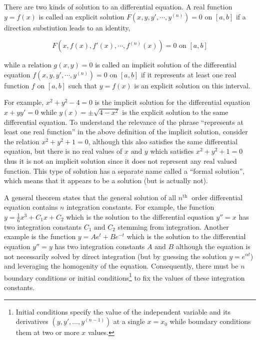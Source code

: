 \documentclass[english,a4paper,12pt]{report}
\begin{document}
There are two kinds of solution to an differential equation. A real function \(y=f(x)\) is called an explicit solution \(F(x,y,y',\cdots ,y^{(n)}) = 0\) on \([a,b]\) if a direction substiution leads to an identity, \ie 

\begin{equation}
    F(x,f(x),f'(x),\cdots ,f^{(n)}(x)) =0 \text{ on } [a,b]
\end{equation}

while a relation \(g(x,y) = 0\) is called an implicit solution of the differential equation \(f(x,y,y',\cdots ,y^{(n)} ) = 0\) on \([a,b]\) if it represents at least one real function \(f\) on \([a,b]\) such that \(y=f(x)\) is an explicit solution on this interval. 

For example, \(x^2+y^2-4=0\) is the implicit solution for the differential equation \(x+y y'=0\) while \(y(x) = \pm \sqrt{4-x^2} \) is the explicit solution to the same differential equation. To understand the relevance of the phrase ``represents at least one real function'' in the above definition of the implicit solution, consider the relation \(x^2+y^2+1=0\), although this also satisfies the same differential equation, but there is no real values of \(x\text { and } y\) which satisfies \(x^2+y^2+1=0\) thus it is not an implicit solution since it does not represent any real valued function. This type of solution has a separate name called a ``formal solution'', which means that it appears to be a solution (but is actually not).

A general theorem states that the general solution of all \(n^{\text{th }} \) order differential equation contains \(n\) integration constants. For example, the function \(y=\frac{1}{6} x^3 + C_1 x + C_2 \) which is the solution to the differential equation \(y'' = x\) has two integration constants \(C_1 \text { and } C_2 \) stemming from integration. Another example is the function \(y = Ae^{ t} + Be^{- t}  \) which is the solution to the differential equation \(y'' = y\) has two integration constants \(A\text { and } B\) although the equation is not necessarily solved by direct integration (but by guessing the solution \(y=e^{\alpha t} \)) and leveraging the homogenity of the equation. Consequently, there must be \(n\) boundary conditions or initial conditions\footnote{Initial conditions specify the value of the independent variable and its derivatives \((y,y',\ldots ,y^{(n-1)} )\) at a single \(x = x_0 \) while boundary conditions them at two or more \(x\) values.} to fix the values of these integration constants. 
\end{document}
